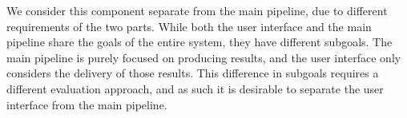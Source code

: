 We consider this component separate from the main pipeline, due to different requirements of the two parts. While both the user interface and the main pipeline share the goals of the entire system, they have different subgoals. The main pipeline is purely focused on producing results, and the user interface only considers the delivery of those results. This difference in subgoals requires a different evaluation approach, and as such it is desirable to separate the user interface from the main pipeline.










